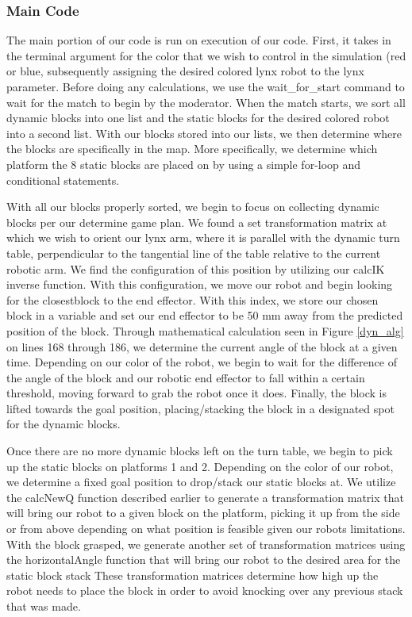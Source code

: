 \documentclass{article}
\begin{document}
    \subsubsection{Main Code}
    The main portion of our code is run on execution of our code.  First, it takes in the terminal argument for the color that we wish to control in the simulation (red or blue, subsequently assigning the desired colored lynx robot to the lynx parameter.  Before doing any calculations, we use the wait\_for\_start command to wait for the match to begin by the moderator.  When the match starts, we sort all dynamic blocks into one list and the static blocks for the desired colored robot into a second list.  With our blocks stored into our lists, we  then determine where the blocks are specifically in the map.  More specifically, we determine which platform the 8 static blocks are placed on by using a simple for-loop and conditional statements. 
    
    With all our blocks properly sorted, we begin to focus on collecting dynamic blocks per our determine game plan.  We found a set transformation matrix at which we wish to orient our lynx arm, where it is parallel with the dynamic turn table, perpendicular to the tangential line of the table relative to the current robotic arm.  We find the configuration of this position by utilizing our calcIK inverse function.  With this configuration, we move our robot and begin looking for the closestblock to the end effector.  With this index, we store our chosen block in a variable and set our end effector to be 50 mm away from the predicted position of the block.  Through mathematical calculation seen in Figure \ref{dyn_alg} on lines 168 through 186, we determine the current angle of the block at a given time.  Depending on our color of the robot, we begin to wait for the difference of the angle of the block and our robotic end effector to fall within a certain threshold, moving forward to grab the robot once it does.  Finally, the block is lifted towards the goal position, placing/stacking the block in a designated spot for the dynamic blocks.
    
    
    Once there are no more dynamic blocks left on the turn table, we begin to pick up the static blocks on platforms 1 and 2.  Depending on the color of our robot, we determine a fixed goal position to drop/stack our static blocks at.  We utilize the calcNewQ function described earlier to generate a transformation matrix that will bring our robot to a given block on the platform, picking it up from the side or from above depending on what position is feasible given our robots limitations.  With the block grasped, we generate another set of transformation matrices using the horizontalAngle function that will bring our robot to the desired area for the static block stack  These transformation matrices determine how high up the robot needs to place the block in order to avoid knocking over any previous stack that was made.  
    
\end{document}
